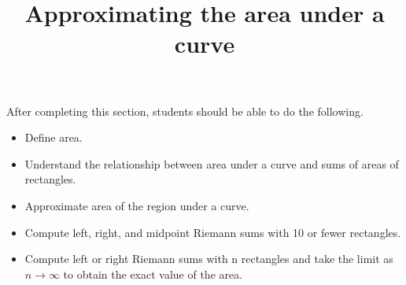 \documentclass{ximera}
\title{Approximating the area under a curve}
\begin{document}
\begin{abstract}
\end{abstract}

\maketitle

\begin{sectionOutcomes}

After completing this section, students should be able to do the following.

\begin{itemize}
	\item Define area.
	\item Understand the relationship between area under a curve and sums of areas of rectangles.
	\item Approximate area of the region under a curve.
	\item Compute left, right, and midpoint Riemann sums with 10 or fewer rectangles.
	\item Compute left or right Riemann sums with n rectangles and take the limit as $n\to\infty$ to obtain the exact value of the area.
\end{itemize}

\end{sectionOutcomes}
\end{document}
